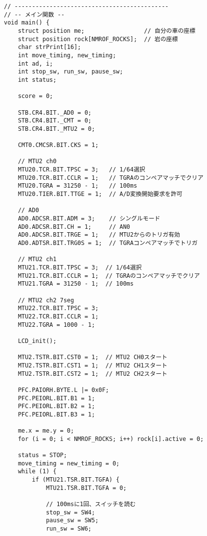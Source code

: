 \documentclass[a4paper,11pt,dvipdfmx]{jsarticle}
\begin{document}
\begin{lstlisting}[caption=main.c, label=lst:main]
// --------------------------------------------
// -- メイン関数 --
void main() {
    struct position me;                 // 自分の車の座標
    struct position rock[NMROF_ROCKS];  // 岩の座標
    char strPrint[16];
    int move_timing, new_timing;
    int ad, i;
    int stop_sw, run_sw, pause_sw;
    int status;

    score = 0;

    STB.CR4.BIT._AD0 = 0;
    STB.CR4.BIT._CMT = 0;
    STB.CR4.BIT._MTU2 = 0;

    CMT0.CMCSR.BIT.CKS = 1;

    // MTU2 ch0
    MTU20.TCR.BIT.TPSC = 3;   // 1/64選択
    MTU20.TCR.BIT.CCLR = 1;   // TGRAのコンペアマッチでクリア
    MTU20.TGRA = 31250 - 1;   // 100ms
    MTU20.TIER.BIT.TTGE = 1;  // A/D変換開始要求を許可

    // AD0
    AD0.ADCSR.BIT.ADM = 3;    // シングルモード
    AD0.ADCSR.BIT.CH = 1;     // AN0
    AD0.ADCSR.BIT.TRGE = 1;   // MTU2からのトリガ有効
    AD0.ADTSR.BIT.TRG0S = 1;  // TGRAコンペアマッチでトリガ

    // MTU2 ch1
    MTU21.TCR.BIT.TPSC = 3;  // 1/64選択
    MTU21.TCR.BIT.CCLR = 1;  // TGRAのコンペアマッチでクリア
    MTU21.TGRA = 31250 - 1;  // 100ms

    // MTU2 ch2 7seg
    MTU22.TCR.BIT.TPSC = 3;
    MTU22.TCR.BIT.CCLR = 1;
    MTU22.TGRA = 1000 - 1;

    LCD_init();

    MTU2.TSTR.BIT.CST0 = 1;  // MTU2 CH0スタート
    MTU2.TSTR.BIT.CST1 = 1;  // MTU2 CH1スタート
    MTU2.TSTR.BIT.CST2 = 1;  // MTU2 CH2スタート

    PFC.PAIORH.BYTE.L |= 0x0F;
    PFC.PEIORL.BIT.B1 = 1;
    PFC.PEIORL.BIT.B2 = 1;
    PFC.PEIORL.BIT.B3 = 1;

    me.x = me.y = 0;
    for (i = 0; i < NMROF_ROCKS; i++) rock[i].active = 0;

    status = STOP;
    move_timing = new_timing = 0;
    while (1) {
        if (MTU21.TSR.BIT.TGFA) {
            MTU21.TSR.BIT.TGFA = 0;

            // 100msに1回、スイッチを読む
            stop_sw = SW4;
            pause_sw = SW5;
            run_sw = SW6;


\end{lstlisting}
\end{document}
